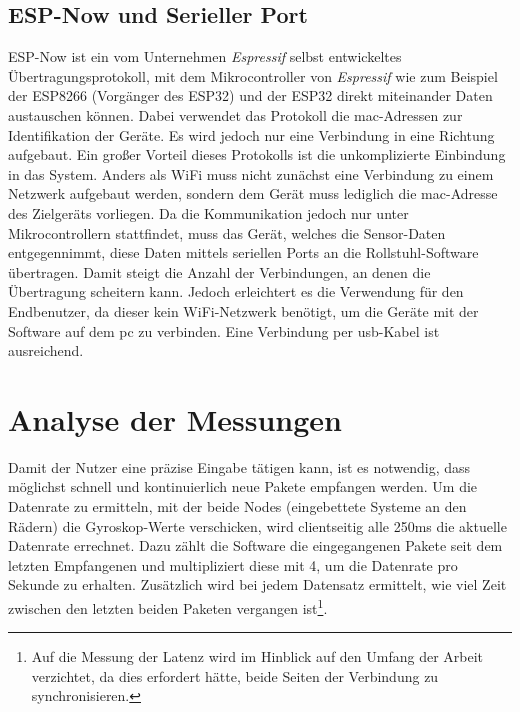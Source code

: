\subsection{ESP-Now und Serieller Port}
ESP-Now ist ein vom Unternehmen \textit{Espressif} selbst entwickeltes Übertragungsprotokoll, mit dem Mikrocontroller von \textit{Espressif} wie zum Beispiel der ESP8266 (Vorgänger des ESP32) und der ESP32 direkt miteinander Daten austauschen können\cite{ESPNowUserGuide2016}.
Dabei verwendet das Protokoll die \ac{mac}-Adressen zur Identifikation der Geräte.
Es wird jedoch nur eine Verbindung in eine Richtung aufgebaut.
Ein großer Vorteil dieses Protokolls ist die unkomplizierte Einbindung in das System.
Anders als WiFi muss nicht zunächst eine Verbindung zu einem Netzwerk aufgebaut werden, sondern dem Gerät muss lediglich die \ac{mac}-Adresse des Zielgeräts vorliegen.
Da die Kommunikation jedoch nur unter Mikrocontrollern stattfindet, muss das Gerät, welches die Sensor-Daten entgegennimmt, diese Daten mittels seriellen Ports an die Rollstuhl-Software übertragen.
Damit steigt die Anzahl der Verbindungen, an denen die Übertragung scheitern kann.
Jedoch erleichtert es die Verwendung für den Endbenutzer, da dieser kein WiFi-Netzwerk benötigt, um die Geräte mit der Software auf dem \ac{pc} zu verbinden.
Eine Verbindung per \ac{usb}-Kabel ist ausreichend.

\section{Analyse der Messungen}
Damit der Nutzer eine präzise Eingabe tätigen kann, ist es notwendig, dass möglichst schnell und kontinuierlich neue Pakete empfangen werden.
Um die Datenrate zu ermitteln, mit der beide Nodes (eingebettete Systeme an den Rädern) die Gyroskop-Werte verschicken, wird clientseitig alle 250ms die aktuelle Datenrate errechnet.
Dazu zählt die Software die eingegangenen Pakete seit dem letzten Empfangenen und multipliziert diese mit 4, um die Datenrate pro Sekunde zu erhalten.
Zusätzlich wird bei jedem Datensatz ermittelt, wie viel Zeit zwischen den letzten beiden Paketen vergangen ist\footnote{Auf die Messung der Latenz wird im Hinblick auf den Umfang der Arbeit verzichtet, da dies erfordert hätte, beide Seiten der Verbindung zu synchronisieren.}.





